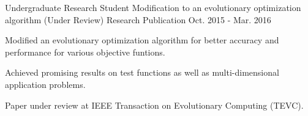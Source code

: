\begin{cventries}
  \cventry
    {Undergraduate Research Student}
    {Modification to an evolutionary optimization algorithm (Under Review)}
    {Research Publication}
    {Oct. 2015 - Mar. 2016}
    {
      \begin{cvitems}
        \item {Modified an evolutionary optimization algorithm for better accuracy and performance for various objective funtions.}
        \item {Achieved promising results on test functions as well as multi-dimensional application problems.}
        \item {Paper under review at IEEE Transaction on Evolutionary Computing (TEVC).}
      \end{cvitems}
    }
\end{cventries}
